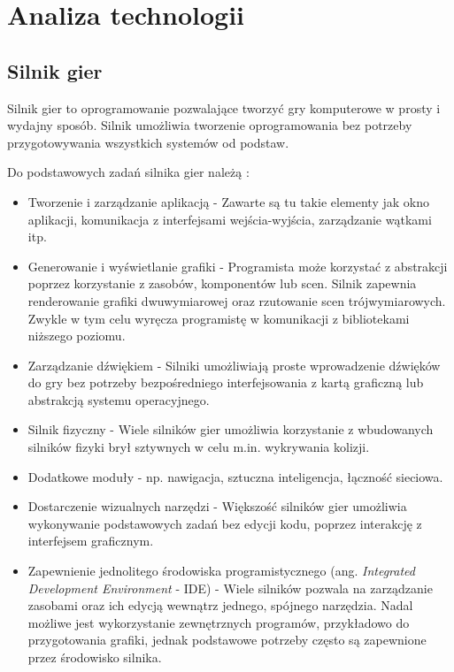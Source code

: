 \chapter{Analiza technologii}
\section{Silnik gier}
Silnik gier to oprogramowanie pozwalające tworzyć gry komputerowe w prosty i wydajny sposób. Silnik umożliwia tworzenie oprogramowania bez potrzeby przygotowywania wszystkich systemów od podstaw. 

Do podstawowych zadań silnika gier należą \cite{pipg4}:
\begin{itemize}
    \item Tworzenie i zarządzanie aplikacją - Zawarte są tu takie elementy jak okno aplikacji, komunikacja z interfejsami wejścia-wyjścia, zarządzanie wątkami itp.
    \item Generowanie i wyświetlanie grafiki - Programista może korzystać z abstrakcji poprzez korzystanie z zasobów, komponentów lub scen. Silnik zapewnia renderowanie grafiki dwuwymiarowej oraz rzutowanie scen trójwymiarowych. Zwykle w tym celu wyręcza programistę w komunikacji z bibliotekami niższego poziomu. 
    \item Zarządzanie dźwiękiem - Silniki umożliwiają proste wprowadzenie dźwięków do gry bez potrzeby bezpośredniego interfejsowania z kartą graficzną lub abstrakcją systemu operacyjnego.
    \item Silnik fizyczny - Wiele silników gier umożliwia korzystanie z wbudowanych silników fizyki brył sztywnych w celu m.in. wykrywania kolizji.
    \item Dodatkowe moduły - np. nawigacja, sztuczna inteligencja, łączność sieciowa.

    \item Dostarczenie wizualnych narzędzi - Większość silników gier umożliwia wykonywanie podstawowych zadań bez edycji kodu, poprzez interakcję z interfejsem graficznym. 
    \item Zapewnienie jednolitego środowiska programistycznego (ang. \emph{Integrated Development Environment} - IDE) - Wiele silników pozwala na zarządzanie zasobami oraz ich edycją wewnątrz jednego, spójnego narzędzia. Nadal możliwe jest wykorzystanie zewnętrznych programów, przykładowo do przygotowania grafiki, jednak podstawowe potrzeby często są zapewnione przez środowisko silnika.
\end{itemize}

